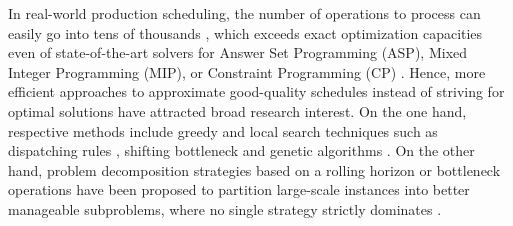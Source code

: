 \documentclass{tlp} %
\begin{document}

In real-world production scheduling, the number of operations to process can easily go
into tens of thousands \citep{coltep19a,kohakamo20a,kotakoscge21a}, which exceeds exact
optimization capacities even of state-of-the-art solvers for Answer Set Programming (ASP),
Mixed Integer Programming (MIP), or Constraint Programming (CP)
\citep{daneshamooz2021mathematical,francescutto2021solving,shi2021solving}.
Hence, more efficient approaches to approximate good-quality schedules 
instead of striving for optimal solutions have attracted broad research interest.
On the one hand, respective methods include greedy and local search techniques such as
dispatching rules \citep{blackstone1982state}, shifting bottleneck \citep{adams1988shifting} and
genetic algorithms \citep{pezzella2008genetic}.
On the other hand, problem decomposition strategies based on a
rolling horizon \citep{singer2001decomposition,liu2008prediction} or
bottleneck operations \citep{zhang2010hybrid,zhai2014decomposition} 
have been proposed to partition large-scale instances into better manageable subproblems,
where no single strategy strictly dominates \citep{ovacik2012decomposition}.

\end{document}
